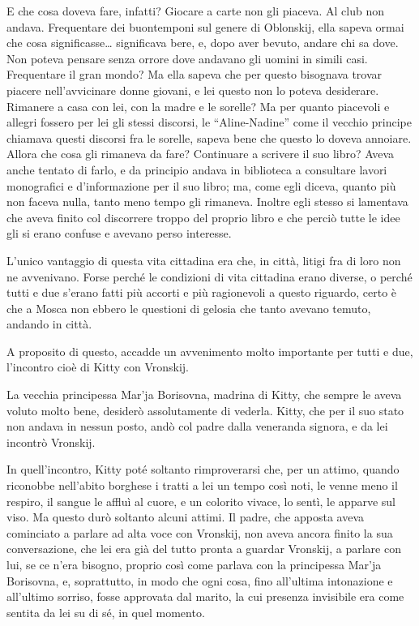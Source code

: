 E che cosa doveva fare, infatti? Giocare a carte non gli piaceva. Al club non andava. Frequentare dei buontemponi sul genere di Oblonskij, ella sapeva ormai che cosa significasse\ldots{} significava bere, e, dopo aver bevuto, andare chi sa dove. Non poteva pensare senza orrore dove andavano gli uomini in simili casi. Frequentare il gran mondo? Ma ella sapeva che per questo bisognava trovar piacere nell'avvicinare donne giovani, e lei questo non lo poteva desiderare. Rimanere a casa con lei, con la madre e le sorelle? Ma per quanto piacevoli e allegri fossero per lei gli stessi discorsi, le ``Aline-Nadine'' come il vecchio principe chiamava questi discorsi fra le sorelle, sapeva bene che questo lo doveva annoiare. Allora che cosa gli rimaneva da fare? Continuare a scrivere il suo libro? Aveva anche tentato di farlo, e da principio andava in biblioteca a consultare lavori monografici e d'informazione per il suo libro; ma, come egli diceva, quanto più non faceva nulla, tanto meno tempo gli rimaneva. Inoltre egli stesso si lamentava che aveva finito col discorrere troppo del proprio libro e che perciò tutte le idee gli si erano confuse e avevano perso interesse. 

L'unico vantaggio di questa vita cittadina era che, in città, litigi fra di loro non ne avvenivano. Forse perché le condizioni di vita cittadina erano diverse, o perché tutti e due s'erano fatti più accorti e più ragionevoli a questo riguardo, certo è che a Mosca non ebbero le questioni di gelosia che tanto avevano temuto, andando in città. 

A proposito di questo, accadde un avvenimento molto importante per tutti e due, l'incontro cioè di Kitty con Vronskij. 

La vecchia principessa Mar'ja Borisovna, madrina di Kitty, che sempre le aveva voluto molto bene, desiderò assolutamente di vederla. Kitty, che per il suo stato non andava in nessun posto, andò col padre dalla veneranda signora, e da lei incontrò Vronskij. 

In quell'incontro, Kitty poté soltanto rimproverarsi che, per un attimo, quando riconobbe nell'abito borghese i tratti a lei un tempo così noti, le venne meno il respiro, il sangue le affluì al cuore, e un colorito vivace, lo sentì, le apparve sul viso. Ma questo durò soltanto alcuni attimi. Il padre, che apposta aveva cominciato a parlare ad alta voce con Vronskij, non aveva ancora finito la sua conversazione, che lei era già del tutto pronta a guardar Vronskij, a parlare con lui, se ce n'era bisogno, proprio così come parlava con la principessa Mar'ja Borisovna, e, soprattutto, in modo che ogni cosa, fino all'ultima intonazione e all'ultimo sorriso, fosse approvata dal marito, la cui presenza invisibile era come sentita da lei su di sé, in quel momento. 

